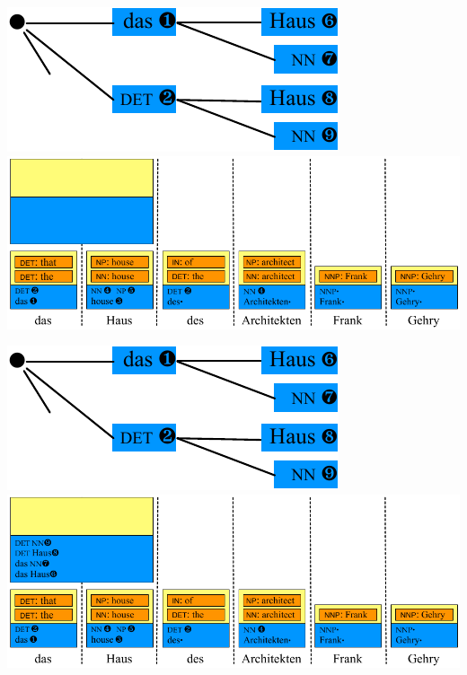 \documentclass[landscape]{slides}
\begin{document}

\begin{center}\vspace{7mm}
\includegraphics[scale=1.4]{accessing-grammar-rules-prefix-early7.pdf}\\[9mm]
\includegraphics[scale=1.4]{accessing-grammar-rules-early-example9.pdf}
\end{center}


\begin{center}\vspace{7mm}
\includegraphics[scale=1.4]{accessing-grammar-rules-prefix-early7.pdf}\\[9mm]
\includegraphics[scale=1.4]{accessing-grammar-rules-early-example10.pdf}
\end{center}
\end{document}

